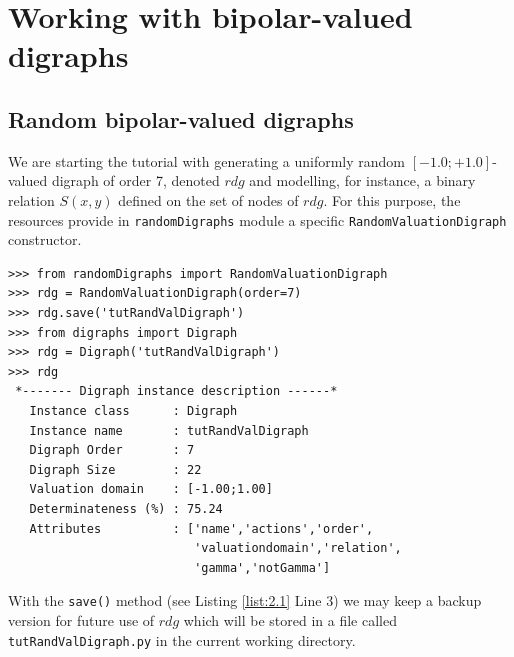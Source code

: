 \chapter{Working with bipolar-valued digraphs}
\label{sec:2}



\section{Random bipolar-valued digraphs}

We are starting the tutorial with generating a uniformly random $[-1.0; +1.0]$-valued digraph of order 7, denoted $rdg$ and modelling, for instance, a binary relation $S(x,y)$ defined on the set of nodes of $rdg$. For this purpose, the \Digraph resources provide in {\tt randomDigraphs} module a specific {\tt RandomValuationDigraph} constructor.
\begin{lstlisting}[caption={Random bipolar-valued digraph instance},label=list:2.1]
>>> from randomDigraphs import RandomValuationDigraph
>>> rdg = RandomValuationDigraph(order=7)
>>> rdg.save('tutRandValDigraph')
>>> from digraphs import Digraph
>>> rdg = Digraph('tutRandValDigraph')
>>> rdg
 *------- Digraph instance description ------*
   Instance class      : Digraph
   Instance name       : tutRandValDigraph
   Digraph Order       : 7
   Digraph Size        : 22
   Valuation domain    : [-1.00;1.00]
   Determinateness (%) : 75.24
   Attributes          : ['name','actions','order',
                          'valuationdomain','relation',
                          'gamma','notGamma']
\end{lstlisting}   
With the {\tt save()}  method (see Listing \ref{list:2.1} Line 3) we may keep a backup version for future use of $rdg$ which will be stored in a file called {\tt tutRandValDigraph.py} in the current working directory.

